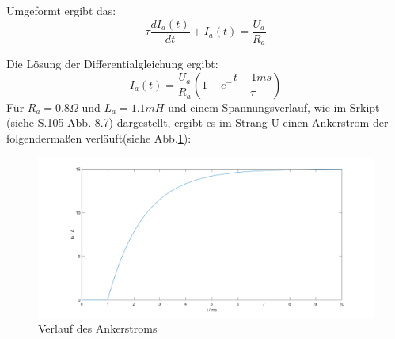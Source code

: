 Umgeformt ergibt das:
\begin{equation}
	\tau\frac{dI_a(t)}{dt} + I_a(t) = \frac{U_a}{R_a}
\end{equation}

Die Lösung der Differentialgleichung ergibt:
\begin{equation}
	I_a(t) = \frac{U_a}{R_a}(1-e^-\frac{t-1ms}{\tau})
\end{equation}
Für $R_a = 0.8 \Omega$ und $L_a = 1.1 mH$ und einem Spannungsverlauf, wie im Srkipt (siehe S.105 Abb. 8.7) dargestellt, ergibt es im Strang U einen Ankerstrom der folgendermaßen verläuft(siehe Abb.\ref{fig:ankerstrom}):
\begin{figure}[htb]
	\includegraphics[width=\textwidth]{./Bilder/Ankerstrom_Aufgabe2d}
	\caption{Verlauf des Ankerstroms}
	\label{fig:ankerstrom}
\end{figure}




%

\clearpage
